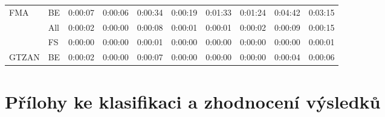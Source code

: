 \begin{table}[H]
{\begin{tabular}{llllllllll}
    \multirow{-3}{*}{FMA}   & \multicolumn{1}{l|}{\cellcolor[HTML]{EFEFEF}BE}  & \cellcolor[HTML]{EFEFEF}0:00:07 & \cellcolor[HTML]{EFEFEF}0:00:06 & \cellcolor[HTML]{EFEFEF}0:00:34 & \cellcolor[HTML]{EFEFEF}0:00:19 & \cellcolor[HTML]{EFEFEF}0:01:33 & \cellcolor[HTML]{EFEFEF}0:01:24 & \cellcolor[HTML]{EFEFEF}0:04:42 & \cellcolor[HTML]{EFEFEF}0:03:15 \\ \cline{1-2}
                            & \multicolumn{1}{l|}{All}                         & 0:00:02                         & 0:00:00                         & 0:00:08                         & 0:00:01                         & 0:00:01                         & 0:00:02                         & 0:00:09                         & 0:00:15                         \\
                            & \multicolumn{1}{l|}{\cellcolor[HTML]{EFEFEF}FS}  & \cellcolor[HTML]{EFEFEF}0:00:00 & \cellcolor[HTML]{EFEFEF}0:00:00 & \cellcolor[HTML]{EFEFEF}0:00:01 & \cellcolor[HTML]{EFEFEF}0:00:00 & \cellcolor[HTML]{EFEFEF}0:00:00 & \cellcolor[HTML]{EFEFEF}0:00:00 & \cellcolor[HTML]{EFEFEF}0:00:00 & \cellcolor[HTML]{EFEFEF}0:00:01 \\
    \multirow{-3}{*}{GTZAN} & \multicolumn{1}{l|}{BE}                          & 0:00:02                         & 0:00:00                         & 0:00:07                         & 0:00:00                         & 0:00:00                         & 0:00:00                         & 0:00:04                         & 0:00:06                        
    \end{tabular}}
\end{table}

\chapter{Přílohy ke klasifikaci a zhodnocení výsledků}
\label{prilohy_ke_klasifikaci_a_zhodnoceni_vysledku}

